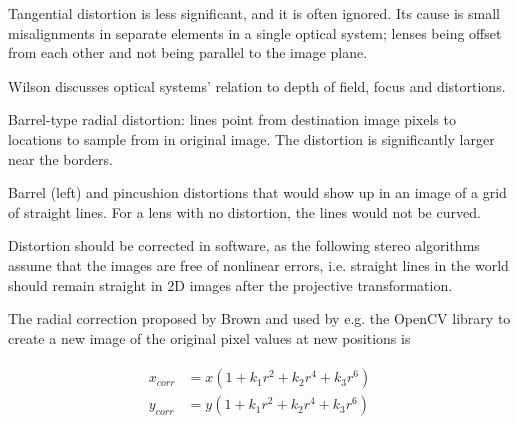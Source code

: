 Tangential distortion is less significant, and it is often ignored. Its cause is small misalignments in separate elements in a single optical system; lenses being offset from each other and not being parallel to the image plane. \cite{kingslake1989history}

Wilson \cite{wilson2004anton} discusses optical systems' relation to depth of field, focus and distortions.


{Barrel-type radial distortion: lines point from destination image pixels to locations to sample from in original image.
The distortion is significantly larger near the borders.}

{Barrel (left) and pincushion distortions that would show up in an image of a grid of straight lines. For a lens with no distortion, the lines would not be curved.}

Distortion should be corrected in software, as the following stereo algorithms assume that the images are free of nonlinear errors, i.e. straight lines in the world should remain straight in 2D images after the projective transformation.

The radial correction proposed by Brown \cite{brown1966decentering} and used by e.g. the OpenCV library \cite{opencv} to create a new image of the original pixel values at new positions is

\begin{align} \label{equ:radialdist} \begin{split}
	x_{corr} &= x(1 + k_1 r^2 + k_2 r^4 + k_3 r^6)\\
	y_{corr} &= y(1 + k_1 r^2 + k_2 r^4 + k_3 r^6)
\end{split} \end{align}

